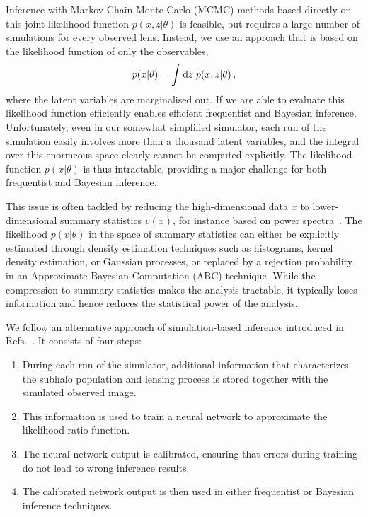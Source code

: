 \documentclass[twocolumn]{aastex62}
\begin{document}
Inference with Markov Chain Monte Carlo (MCMC) methods based directly on this joint likelihood function $p(x,z | \theta)$ is feasible, but requires a large number of simulations for every observed lens. Instead, we use an approach that is based on the likelihood function of only the observables,
%
\begin{equation}
 p(x|\theta) = \int \diff z \; p(x, z|\theta) \,,
 \label{eq:likelihood_latent}
\end{equation}
%
where the latent variables are marginalised out. If we are able to evaluate this likelihood function efficiently enables efficient frequentist and Bayesian inference. Unfortunately, even in our somewhat simplified simulator, each run of the simulation easily involves more than a thousand latent variables, and the integral over this enormeous space clearly cannot be computed explicitly. The likelihood function $p(x | \theta)$ is thus intractable, providing a major challenge for both frequentist and Bayesian inference.

This issue is often tackled by reducing the high-dimensional data $x$ to lower-dimensional summary statistics $v(x)$, for instance based on power spectra~\citep{1403.2720,1809.00004,1707.04590,1806.07897,1808.03501,1710.03075,1506.01724}. The likelihood $p(v|\theta)$ in the space of summary statistics can either be explicitly estimated through density estimation techniques such as histograms, kernel density estimation, or Gaussian processes, or replaced by a rejection probability in an Approximate Bayesian Computation (ABC) technique. While the compression to summary statistics makes the analysis tractable, it typically loses information and hence reduces the statistical power of the analysis.

We follow an alternative approach of simulation-based inference introduced in Refs.~\cite{1805.00013,1805.00020,1805.12244}. It consists of four steps:
%
\begin{enumerate}
  \item During each run of the simulator, additional information that characterizes the subhalo population and lensing process is stored together with the simulated observed image.
  \item This information is used to train a neural network to approximate the likelihood ratio function.
  \item The neural network output is calibrated, ensuring that errors during training do not lead to wrong inference results.
  \item The calibrated network output is then used in either frequentist or Bayesian inference techniques.
\end{enumerate}
\end{document}
